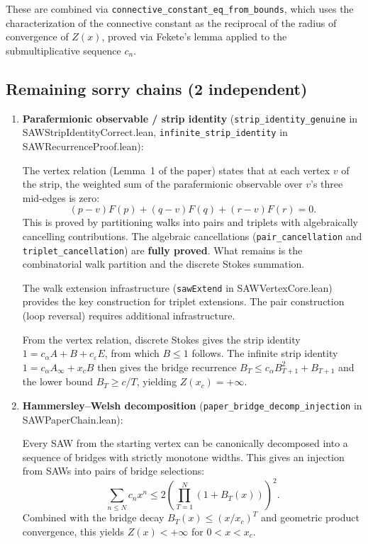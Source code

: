 \begin{lemma}
These are combined via \texttt{connective\_constant\_eq\_from\_bounds}, which uses the
characterization of the connective constant as the reciprocal of the radius of convergence
of $Z(x)$, proved via Fekete's lemma applied to the submultiplicative sequence $c_n$.

\subsection*{Remaining sorry chains (2 independent)}

\begin{enumerate}
\item \textbf{Parafermionic observable / strip identity} (\texttt{strip\_identity\_genuine}
  in SAWStripIdentityCorrect.lean, \texttt{infinite\_strip\_identity} in SAWRecurrenceProof.lean):

  The vertex relation (Lemma~1 of the paper) states that at each vertex $v$ of the strip,
  the weighted sum of the parafermionic observable over $v$'s three mid-edges is zero:
  \[
    (p-v) F(p) + (q-v) F(q) + (r-v) F(r) = 0.
  \]
  This is proved by partitioning walks into pairs and triplets with algebraically
  cancelling contributions. The algebraic cancellations (\texttt{pair\_cancellation}
  and \texttt{triplet\_cancellation}) are \textbf{fully proved}. What remains is
  the combinatorial walk partition and the discrete Stokes summation.

  The walk extension infrastructure (\texttt{sawExtend} in SAWVertexCore.lean)
  provides the key construction for triplet extensions. The pair construction
  (loop reversal) requires additional infrastructure.

  From the vertex relation, discrete Stokes gives the strip identity
  $1 = c_\alpha A + B + c_\varepsilon E$, from which $B \leq 1$ follows.
  The infinite strip identity $1 = c_\alpha A_\infty + x_c B$ then gives the
  bridge recurrence $B_T \leq c_\alpha B_{T+1}^2 + B_{T+1}$ and the
  lower bound $B_T \geq c/T$, yielding $Z(x_c) = +\infty$.

\item \textbf{Hammersley--Welsh decomposition}
  (\texttt{paper\_bridge\_decomp\_injection} in SAWPaperChain.lean):

  Every SAW from the starting vertex can be canonically decomposed into
  a sequence of bridges with strictly monotone widths. This gives an injection
  from SAWs into pairs of bridge selections:
  \[
    \sum_{n \leq N} c_n x^n \leq 2 \left( \prod_{T=1}^{N} (1 + B_T(x)) \right)^2.
  \]
  Combined with the bridge decay $B_T(x) \leq (x/x_c)^T$ and geometric
  product convergence, this yields $Z(x) < +\infty$ for $0 < x < x_c$.


\end{enumerate}
\end{lemma}
